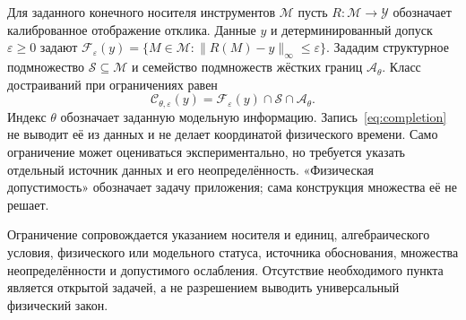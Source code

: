 \section{}
\label{sec:constraints}
{Для заданного конечного носителя инструментов $\mathcal M$ пусть $R:\mathcal M\to\mathcal Y$ обозначает калиброванное отображение отклика. Данные $y$ и детерминированный допуск $\varepsilon\geq0$ задают $\mathcal F_\varepsilon(y)=\{M\in\mathcal M:\|R(M)-y\|_\infty\leq\varepsilon\}$. Зададим структурное подмножество $\mathcal S\subseteq\mathcal M$ и семейство подмножеств жёстких границ $\mathcal A_\theta$. Класс достраиваний при ограничениях равен}
\begin{equation}\label{eq:completion}
 \mathcal C_{\theta,\varepsilon}(y)=\mathcal F_\varepsilon(y)\cap\mathcal S\cap\mathcal A_\theta.
\end{equation}
{Индекс $\theta$ обозначает заданную модельную информацию. Запись~\eqref{eq:completion} не выводит её из данных и не делает координатой физического времени. Само ограничение может оцениваться экспериментально, но требуется указать отдельный источник данных и его неопределённость. «Физическая допустимость» обозначает задачу приложения; сама конструкция множества её не решает.}

\begin{definition}\label{def:record}
{Ограничение сопровождается указанием носителя и единиц, алгебраического условия, физического или модельного статуса, источника обоснования, множества неопределённости и допустимого ослабления. Отсутствие необходимого пункта является открытой задачей, а не разрешением выводить универсальный физический закон.}
\end{definition}


